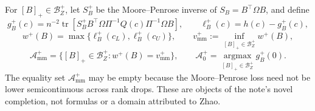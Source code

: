 For \([B]_+\in\mathcal B_Z^+\), let \(S_B^+\) be the Moore--Penrose inverse of \(S_B=B^{\top}\Omega B\), and define
\[
g_B^+(c)=n^{-2}\operatorname{tr}\!\left[S_B^+B^{\top}\Omega\Pi^{-1}Q(c)\Pi^{-1}\Omega B\right],
\qquad \ell_B^+(c)=h(c)-g_B^+(c),
\]
\[
w^+(B)=\max\{\ell_B^+(c_L),\ell_B^+(c_U)\},
\qquad v_{\mathrm{mm}}^+:=\inf_{[B]_+\in\mathcal B_Z^+}w^+(B),
\]
\[
\mathcal A_{\mathrm{mm}}^+
=\{[B]_+\in\mathcal B_Z^+:w^+(B)=v_{\mathrm{mm}}^+\},
\qquad \mathcal A_0^+=\operatorname*{argmax}_{[B]_+\in\mathcal B_Z^+}g_B^+(0).
\]
The equality set \(\mathcal A_{\mathrm{mm}}^+\) may be empty because the Moore--Penrose loss need not be lower semicontinuous across rank drops.  These are objects of the note's novel completion, not formulas or a domain attributed to Zhao.